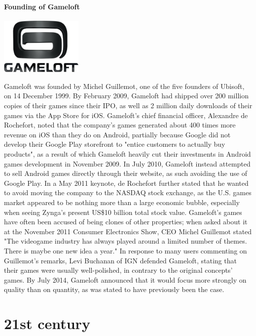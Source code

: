 \documentclass[11pt]{report}
\begin{document}
\subsection{Founding of Gameloft}
\vspace{2mm}\begin{center}\includegraphics[width=4cm]{./img/gameloftLogo.jpg}\end{center}
Gameloft was founded by Michel Guillemot, one of the five founders of Ubisoft, on 14 December 1999. By February 2009, Gameloft had shipped over 200 million copies of their games since their IPO, as well as 2 million daily downloads of their games via the App Store for iOS. Gameloft's chief financial officer, Alexandre de Rochefort, noted that the company's games generated about 400 times more revenue on iOS than they do on Android, partially because Google did not develop their Google Play storefront to "entice customers to actually buy products", as a result of which Gameloft heavily cut their investments in Android games development in November 2009. In July 2010, Gameloft instead attempted to sell Android games directly through their website, as such avoiding the use of Google Play. In a May 2011 keynote, de Rochefort further stated that he wanted to avoid moving the company to the NASDAQ stock exchange, as the U.S. games market appeared to be nothing more than a large economic bubble, especially when seeing Zynga's present US\$10 billion total stock value. Gameloft's games have often been accused of being clones of other properties; when asked about it at the November 2011 Consumer Electronics Show, CEO Michel Guillemot stated "The videogame industry has always played around a limited number of themes. There is maybe one new idea a year." In response to many users commenting on Guillemot's remarks, Levi Buchanan of IGN defended Gameloft, stating that their games were usually well-polished, in contrary to the original concepts' games. By July 2014, Gameloft announced that it would focus more strongly on quality than on quantity, as was stated to have previously been the case.

					
\part{21st century}
\end{document}
